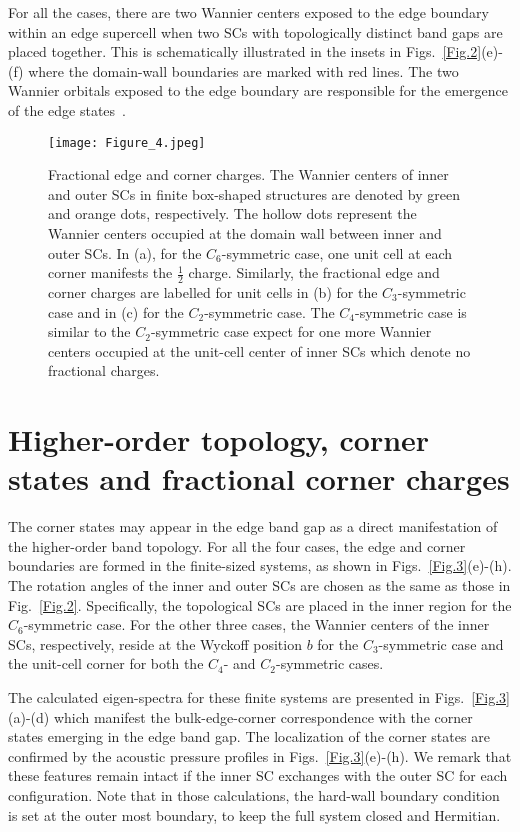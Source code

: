 \documentclass[doublecol]{epl2}
\begin{document}
For all the cases, there are two Wannier centers exposed to the edge boundary within an edge supercell when two SCs with topologically distinct band gaps are placed together. This is schematically illustrated in the insets in Figs.~\ref{Fig.2}(e)-(f) where the domain-wall boundaries are marked with red lines. The two Wannier orbitals exposed to the edge boundary are responsible for the emergence of the edge states~\cite{benalcazar2019quantization}.


\begin{figure*}[t]
\centering\texttt{[image: Figure\_4.jpeg]}
\caption{Fractional edge and corner charges. The Wannier centers of inner and outer SCs in finite box-shaped structures are denoted by green and orange dots, respectively. The hollow dots represent the Wannier centers occupied at the domain wall between inner and outer SCs. In (a), for the $C_6$-symmetric case, one unit cell at each corner manifests the $\frac{1}{2}$ charge. Similarly, the fractional edge and corner charges are labelled for unit cells in (b) for the $C_3$-symmetric case and in (c) for  the $C_2$-symmetric case. The $C_4$-symmetric case is similar to the $C_2$-symmetric case expect for one more Wannier centers occupied at the unit-cell center of inner SCs which denote no fractional charges.}
\label{Fig.4}
\end{figure*}



\section{Higher-order topology, corner states and fractional corner charges}

The corner states may appear in the edge band gap as a direct manifestation of the higher-order band topology. For all the four cases, the edge and corner boundaries are formed in the finite-sized systems, as shown in Figs.~\ref{Fig.3}(e)-(h). The rotation angles of the inner and outer SCs are chosen as the same as those in Fig.~\ref{Fig.2}. Specifically, the topological SCs are placed in the inner region for the $C_6$-symmetric case. For the other three cases, the Wannier centers of the inner SCs, respectively, reside at the Wyckoff position $b$ for the $C_3$-symmetric case and the unit-cell corner for both the $C_4$- and $C_2$-symmetric cases. 

The calculated eigen-spectra for these finite systems are presented in Figs.~\ref{Fig.3}(a)-(d) which manifest the bulk-edge-corner correspondence with the corner states emerging in the edge band gap. The localization of the corner states are confirmed by the acoustic pressure profiles in Figs.~\ref{Fig.3}(e)-(h). We remark that these features remain intact if the inner SC exchanges with the outer SC for each configuration. Note that in those calculations, the hard-wall boundary condition is set at the outer most boundary, to keep the full system closed and Hermitian.
\end{document}
